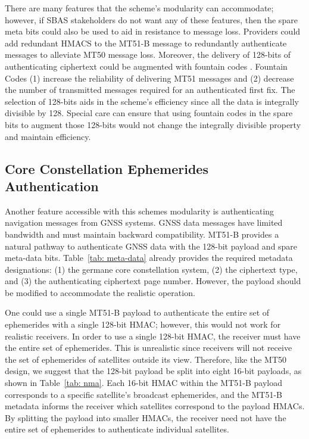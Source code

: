 \documentclass[letterpaper,times]{IONconf/IONconf}
\begin{document}
		There are many features that the scheme's modularity can accommodate; however, if SBAS stakeholders do not want any of these features, then the spare meta bits could also be used to aid in resistance to message loss.
		Providers could add redundant HMACS to the MT51-B message to redundantly authenticate messages to alleviate MT50 message loss.
		Moreover, the delivery of 128-bits of authenticating ciphertext could be augmented with fountain codes \cite{gnss_fountain_codes}.
		Fountain Codes (1) increase the reliability of delivering MT51 messages and (2) decrease the number of transmitted messages required for an authenticated first fix.
		The selection of 128-bits aids in the scheme's efficiency since all the data is integrally divisible by 128.
		Special care can ensure that using fountain codes in the spare bits to augment those 128-bits would not change the integrally divisible property and maintain efficiency.

	\subsection{Core Constellation Ephemerides Authentication} \label{sub:core_eph}

		Another feature accessible with this schemes modularity is authenticating navigation messages from GNSS systems.
		GNSS data messages have limited bandwidth and must maintain backward compatibility.
		MT51-B provides a natural pathway to authenticate GNSS data with the 128-bit payload and spare meta-data bits.
		Table~\ref{tab: meta-data} already provides the required metadata designations: (1) the germane core constellation system, (2) the ciphertext type, and (3) the authenticating ciphertext page number.
		However, the payload should be modified to accommodate the realistic operation.

		One could use a single MT51-B payload to authenticate the entire set of ephemerides with a single 128-bit HMAC; however, this would not work for realistic receivers.
		In order to use a single 128-bit HMAC, the receiver must have the entire set of ephemerides.
		This is unrealistic since receivers will not receive the set of ephemerides of satellites outside its view.
		Therefore, like the MT50 design, we suggest that the 128-bit payload be split into eight 16-bit payloads, as shown in Table~\ref{tab: nma}.
		Each 16-bit HMAC within the MT51-B payload corresponds to a specific satellite's broadcast ephemerides, and the MT51-B metadata informs the receiver which satellites correspond to the payload HMACs.
		By splitting the payload into smaller HMACs, the receiver need not have the entire set of ephemerides to authenticate individual satellites.
\end{document}

